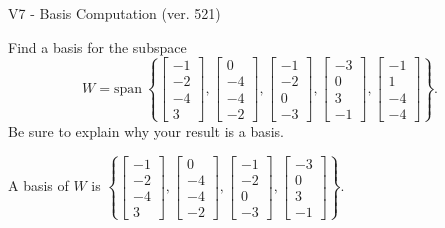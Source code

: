 \begin{exercise}
  \begin{exerciseTitle}V7 - Basis Computation (ver. 521)\end{exerciseTitle}
  \begin{exerciseStatement}
    Find a basis for the subspace 
\[W=\mathrm{span}\ \left\{\left[\begin{array}{r}
-1 \\
-2 \\
-4 \\
3
\end{array}\right] , \left[\begin{array}{r}
0 \\
-4 \\
-4 \\
-2
\end{array}\right] , \left[\begin{array}{r}
-1 \\
-2 \\
0 \\
-3
\end{array}\right] , \left[\begin{array}{r}
-3 \\
0 \\
3 \\
-1
\end{array}\right] , \left[\begin{array}{r}
-1 \\
1 \\
-4 \\
-4
\end{array}\right]\right\}.\]
 Be sure to explain why your result is a basis.


  \end{exerciseStatement}
  \begin{exerciseAnswer}
   A basis of \(W\) is  \(\left\{\left[\begin{array}{r}
-1 \\
-2 \\
-4 \\
3
\end{array}\right] , \left[\begin{array}{r}
0 \\
-4 \\
-4 \\
-2
\end{array}\right] , \left[\begin{array}{r}
-1 \\
-2 \\
0 \\
-3
\end{array}\right] , \left[\begin{array}{r}
-3 \\
0 \\
3 \\
-1
\end{array}\right]\right\}\).
  


  \end{exerciseAnswer}
\end{exercise}